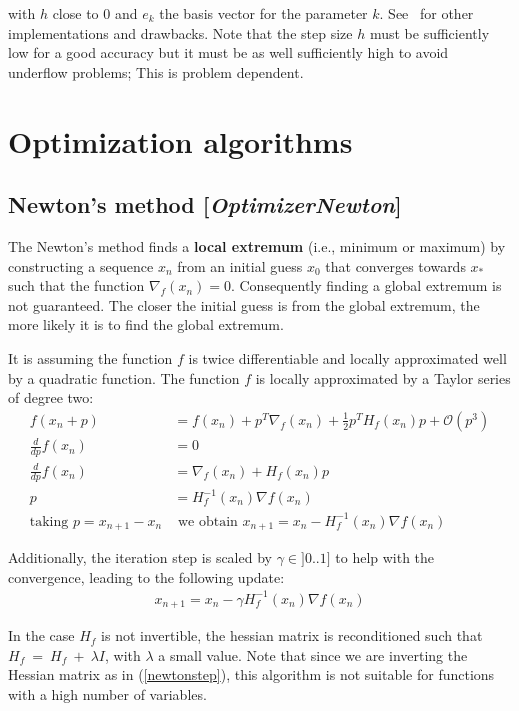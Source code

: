 \documentclass[11pt]{article}
\newcommand{\bigO}{\mathcal{O}}
\newcommand{\nllref}[1]{[\small{\textit{#1}}]}
\begin{document}
with $h$ close to 0 and $e_k$ the basis vector for the parameter $k$. See~\cite{Scolnik01} for other implementations and drawbacks. Note that the step size $h$ must be sufficiently low for a good accuracy but it must be as well sufficiently high to avoid underflow problems; This is problem dependent.

\section{Optimization algorithms}
\subsection{Newton's method \nllref{OptimizerNewton}}
The Newton's method finds a \textbf{local extremum} (i.e., minimum or maximum) by constructing a sequence $x_n$ from an initial guess $x_0$ that converges towards $x_*$ such that the function $\nabla_f(x_n)=0$. Consequently finding a global extremum is not guaranteed. The closer the initial guess is from the global extremum, the more likely it is to find the global extremum.

It is assuming the function $f$ is twice differentiable and locally approximated well by a quadratic function. The function $f$ is locally approximated by a Taylor series of degree two:
\begin{align}
f(x_n + p)&= f(x_n) + p^T \nabla_f(x_n) + \frac{1}{2} p^T H_f(x_n) p + \bigO(p^3) \nonumber\\
\frac{d}{dp}f(x_n) &= 0 \nonumber\\
\frac{d}{dp}f(x_n) &=\nabla_f(x_n) + H_f(x_n) p \nonumber\\
p &= H_f^{-1}(x_n) \nabla{f}(x_n) \nonumber\\
\text{taking~} p = x_{n+1} - x_n \nonumber
&\text{~we obtain~} x_{n+1} = x_n - H_f^{-1}(x_n) \nabla{f}(x_n)
\end{align}

Additionally, the iteration step is scaled by $\gamma \in ]0..1]$ to help with the convergence, leading to the following update:
\begin{align}
x_{n+1} = x_n - \gamma H_f^{-1}(x_n) \nabla{f}(x_n) \label{newtonstep}
\end{align}

In the case $H_f$ is not invertible, the hessian matrix is reconditioned such that $H_f~=~H_f~+~\lambda I$, with $\lambda$ a small value. Note that since we are inverting the Hessian matrix as in (\ref{newtonstep}), this algorithm is not suitable for functions with a high number of variables.
\end{document}
